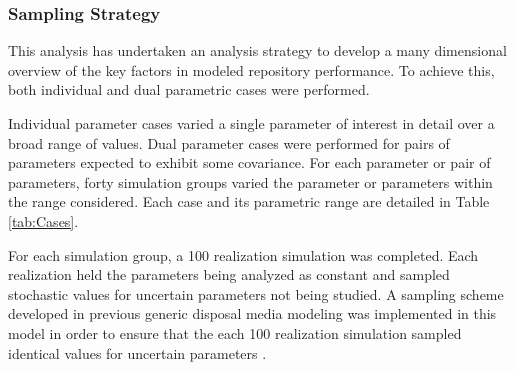 \begin{frame}[c]
  \frametitle{Sampling Strategy}
This analysis has undertaken an analysis strategy to develop a many dimensional 
overview of the key factors in modeled repository performance. To achieve this, 
both individual and dual parametric cases were performed.

Individual parameter cases varied a single parameter of interest in 
detail over a broad range of values. Dual parameter cases were 
performed for pairs of parameters expected to exhibit some covariance. For 
each parameter or pair of parameters, forty simulation 
groups varied the parameter or parameters within the range considered. Each 
case and its parametric range are detailed in Table \ref{tab:Cases}. 



For each simulation group, a 100 realization simulation was completed. Each
realization held the parameters being analyzed as constant and sampled 
stochastic values for uncertain parameters not being studied.  A sampling scheme 
developed in previous generic disposal media modeling was implemented in this 
model in order to ensure that the each 100 realization simulation sampled 
identical values for uncertain parameters \cite{clayton_generic_2011, 
nutt_generic_2009}.  

\end{frame}
